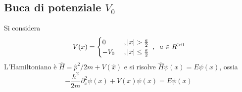 \documentclass[11pt, a4paper]{scrartcl} %
\numberwithin{equation}{subsection}
\theoremstyle{style2}
\theoremstyle{style1}
\begin{document}
\subsection{Buca di potenziale $V_0$}

Si considera 
\[
V(x) = \begin{cases}
 0 & \ , \lvert x \rvert > \frac{a}{2}\\
-V_0 &\ , \lvert x \rvert \le \frac{a}{2}
\end{cases}\hspace{.1cm} , \hspace{.2cm} a \in R^{>0} 
\] 
L'Hamiltoniano \`e $\hat{H} = \hat{p}^2 / 2m + V(\hat{x})$ e si risolve $\hat{H}\psi (x) = E \psi (x)$, ossia
\begin{equation}
	-\frac{\hbar ^2}{2m} \partial _x^2 \psi (x) + V(x) \psi (x) = E\psi (x)
\end{equation}
\end{document}
